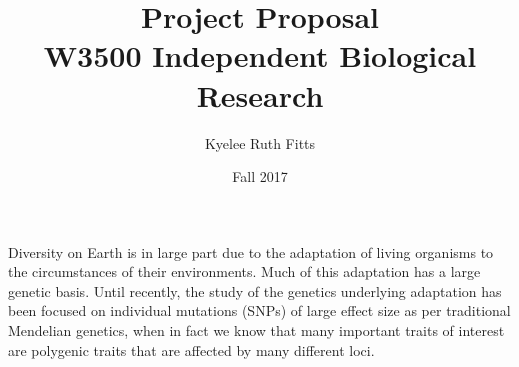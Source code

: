 \documentclass[a4paper,10pt]{article}
\begin{document}
\title{\vspace{-2.0cm}
  Project Proposal \\
  \large W3500 Independent Biological Research \\
}

\author{
  Kyelee Ruth Fitts
}

\date{Fall 2017}
  
\maketitle

%
%
%
%

Diversity on Earth is in large part due to the adaptation of living
organisms to the circumstances of their environments. Much of this
adaptation has a large genetic basis. Until recently, the study of the genetics underlying
adaptation has been focused on individual mutations (SNPs) of large
effect size as per traditional Mendelian genetics, when in fact we
know that many important traits of interest are polygenic traits that are affected by many
different loci.
\end{document}
